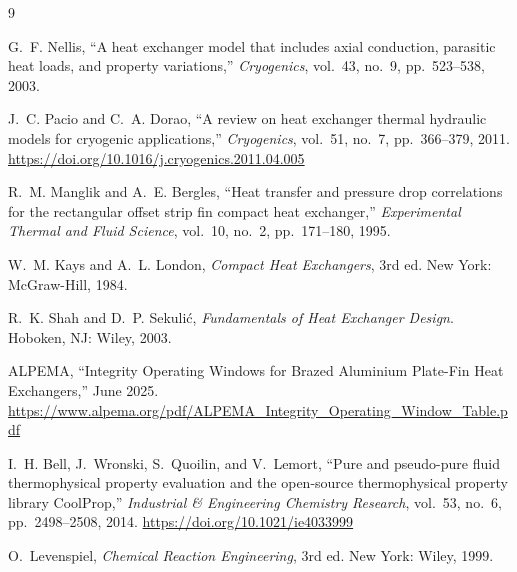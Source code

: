 \documentclass[11pt]{article}
\begin{document}
\begin{thebibliography}{9}

G.~F. Nellis, ``A heat exchanger model that includes axial conduction, parasitic heat loads, and property variations,'' \emph{Cryogenics}, vol.~43, no.~9, pp.~523--538, 2003.

J.~C. Pacio and C.~A. Dorao, ``A review on heat exchanger thermal hydraulic models for cryogenic applications,'' \emph{Cryogenics}, vol.~51, no.~7, pp.~366--379, 2011. \url{https://doi.org/10.1016/j.cryogenics.2011.04.005}

R.~M. Manglik and A.~E. Bergles, ``Heat transfer and pressure drop correlations for the rectangular offset strip fin compact heat exchanger,'' \emph{Experimental Thermal and Fluid Science}, vol.~10, no.~2, pp.~171--180, 1995.

W.~M. Kays and A.~L. London, \emph{Compact Heat Exchangers}, 3rd ed. New York: McGraw-Hill, 1984.

R.~K. Shah and D.~P. Sekuli\'c, \emph{Fundamentals of Heat Exchanger Design}. Hoboken, NJ: Wiley, 2003.

ALPEMA, ``Integrity Operating Windows for Brazed Aluminium Plate-Fin Heat Exchangers,'' June 2025. \url{https://www.alpema.org/pdf/ALPEMA_Integrity_Operating_Window_Table.pdf}

I.~H. Bell, J.~Wronski, S.~Quoilin, and V.~Lemort, ``Pure and pseudo-pure fluid thermophysical property evaluation and the open-source thermophysical property library CoolProp,'' \emph{Industrial \& Engineering Chemistry Research}, vol.~53, no.~6, pp.~2498--2508, 2014. \url{https://doi.org/10.1021/ie4033999}

O.~Levenspiel, \emph{Chemical Reaction Engineering}, 3rd ed. New York: Wiley, 1999.

\end{thebibliography}
\end{document}
